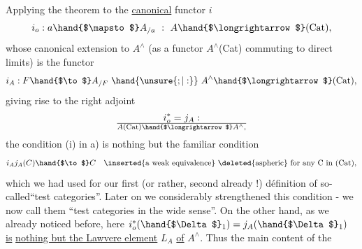Applying the theorem to the \uline{canonical} functor $i$
\[ i_o : a \hand{$\mapsto$} A_{/a} \ : \ A \hand{$\longrightarrow$} \text{(Cat)} , \]
whose canonical extension to $A^\wedge$ (as a functor $A^\wedge$\hand{$\to$}(Cat) commuting to
direct limits) is the functor 
\[ i_A : F \hand{$\to$} A_{/F} \ \hand{\unsure{;|:}} \ A^\wedge \hand{$\longrightarrow$} \text{(Cat)} , \]
giving rise to the right adjoint
\[ i_o^{*} = j_A : \over{A}{(}\text{Cat)} \hand{$\longrightarrow$} A^\wedge , \]
the condition (i) in a) is nothing but the familiar condition
\[ i_A j_A(C) \hand{$\to$} C \quad \text{\inserted{a weak equivalence} \deleted{aspheric} for any C in (Cat)} , \]
which we had used for our first (or rather, second already !) définition
of so-called``test categories''. Later on we considerably strengthened this
condition - we now call them ``test categories in the wide sense''. On 
the other hand, as we already noticed before, here $i_o^{*}(\hand{$\Delta$}_1) = j_A(\hand{$\Delta$}_1)$ \uline{is}
\uline{nothing but the Lawvere element} $L_A$ \uline{of} $A^\wedge$. Thus the main content of the
